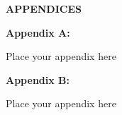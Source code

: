 \begin{center}
    \large{\textbf{APPENDICES}}
\end{center}

\appendix
{}
\noindent
 \textbf{Appendix A:  }

\noindent
Place your appendix here

\vspace{.2in}
\noindent
\textbf{Appendix B: }

\noindent
Place your appendix here
